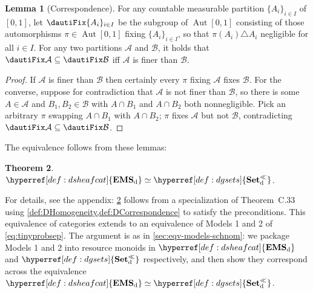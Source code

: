 \documentclass[
  sigconf,
  screen, ]{acmart}
\makeatletter
\theoremstyle{definition}
\newtheorem{theorem}{Theorem}[section]
\newtheorem{lemma}[theorem]{Lemma}
\newcommand\Aut{\operatorname{Aut}}
\newcommand\calA{\mathcal A}
\newcommand\calB{\mathcal B}
\newcommand\llbr[1]{\left\llbracket #1\right\rrbracket}
\newcommand\annoyingappref[1]{Theorem~C.33}
\newcommand\annoyingappref[1]{\cref{#1}}
\newcommand\nref[2]{\hyperref[#1]{#2}} \newcommand\checkhigh{{\huge{\color{red}\textbf{TODO: check}}}}
\newcommand\agoodnamecat{\mathbf{Set}^\ll}
\newcommand\goodsheafcat{\mathbf{EMS}}
\newcommand\dauti{\nref{def:dauti}{\Aut[0,1]}}
\newcommand\discsubscript{_{\rm d}}
\newcommand\dgsets{{\nref{def:dgsets}{\agoodnamecat\discsubscript}}}
\newcommand\dsheafcat{{\nref{def:dsheafcat}{\goodsheafcat\discsubscript}}}
\newcommand*\pdot{\mathpalette\pdot@{.8}}
\newcommand*\pdot@[2]{\mathbin{\vcenter{\hbox{\scalebox{#2}{$\m@th#1\bullet$}}}}}
\makeatother
\begin{document}
\begin{lemma}[Correspondence] \label{def:DCorrespondence}
  For any countable measurable partition $\{A_i\}_{i\in I}$ of $[0,1]$,
  let $\dautiFix\{A_i\}_{i\in I}$ be the subgroup of $\dauti$
  consisting of those automorphisms $\pi\in\dauti$ fixing $\{A_i\}_{i\in I}$, so
  that $\pi(A_i) \triangle A_i$ negligible for all $i\in I$.
  For any two partitions $\calA$ and $\calB$, it holds that
  $\dautiFix\calA\subseteq\dautiFix\calB$
  iff $\calA$ is finer than $\calB$.
\end{lemma}
\begin{proof}
  If $\calA$ is finer than $\calB$ then certainly
  every $\pi$ fixing $\calA$ fixes $\calB$.
  For the converse,
  suppose for contradiction that $\calA$ is not finer than $\calB$,
  so there is some $A\in\calA$ and $B_1,B_2\in\calB$
  with $A\cap B_1$ and $A\cap B_2$ both nonnegligible.
  Pick an arbitrary $\pi$ swapping $A\cap B_1$
  with $A\cap B_2$;
  $\pi$ fixes $\calA$ but not $\calB$,
  contradicting $\dautiFix\calA\subseteq\dautiFix\calB$.
\end{proof}

The equivalence follows from these lemmas:
\begin{theorem} \label{thm:discrete}
  $\dsheafcat\simeq\dgsets$.
\end{theorem}

\newcommand\dshDay{\mathbin{\nref{def:dshDay}{\otimes}}}
\newcommand\dshinc{\nref{def:dshinc}{i}}
\newcommand\dshjoin{\mathbin{\nref{def:dshjoin}{\pdot}}}
\newcommand\dshemp{\mathbin{\nref{def:dshemp}{\mathrm{emp}}}}
\newcommand\dshjoindom{{\nref{def:dshjoindom}{\mathbb P^2_\perp}}}
\newcommand\dshord{\mathrel{\nref{def:dshord}{\sqsubseteq}}}
\newcommand\dshPred{{\nref{def:dshPred}{\mathrm{Pred}}}}
\newcommand\dshSubst[1]{{\nref{def:dshSubst}{\llbr{#1}}}}
For details, see the appendix: \cref{thm:discrete} follows 
from a specialization of \annoyingappref{app:thm:nominal-situation} 
using \cref{def:DHomogeneity,def:DCorrespondence} to satisfy the preconditions.
This equivalence of categories
extends to an equivalence of Models 1 and 2 of \ref{eq:tinyprobsep}.
The argument is as in \cref{sec:eqv-models-schnom}: we
package Models 1 and 2 into resource monoids in $\dsheafcat$ and $\dgsets$
respectively, and then show they correspond across the equivalence $\dsheafcat\simeq\dgsets$.
\end{document}
